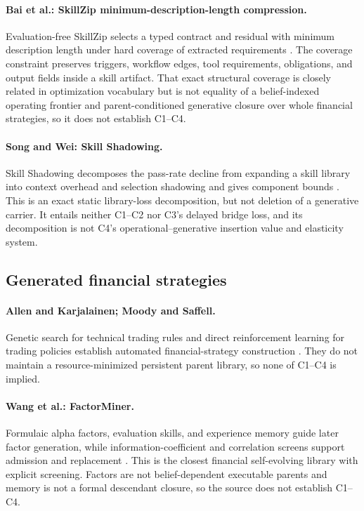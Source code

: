 \paragraph{Bai et al.: SkillZip minimum-description-length compression.}
Evaluation-free SkillZip selects a typed contract and residual with minimum
description length under hard coverage of extracted requirements
\cite{BaiEtAl2026SkillZipMDL}.  The coverage constraint preserves triggers,
workflow edges, tool requirements, obligations, and output fields inside a
skill artifact.  That exact structural coverage is closely related in
optimization vocabulary but is not equality of a belief-indexed operating
frontier and parent-conditioned generative closure over whole financial
strategies, so it does not establish C1--C4.

\paragraph{Song and Wei: Skill Shadowing.}
Skill Shadowing decomposes the pass-rate decline from expanding a skill
library into context overhead and selection shadowing and gives component
bounds \cite{SongWei2026SkillShadowing}.  This is an exact static library-loss
decomposition, but not deletion of a generative carrier.  It entails neither
C1--C2 nor C3's delayed bridge loss, and its decomposition is not C4's
operational--generative insertion value and elasticity system.

\subsection{Generated financial strategies}

\paragraph{Allen and Karjalainen; Moody and Saffell.}
Genetic search for technical trading rules and direct reinforcement learning
for trading policies establish automated financial-strategy construction
\cite{AllenKarjalainen1999,MoodySaffell2001}.  They do not maintain a
resource-minimized persistent parent library, so none of C1--C4 is implied.

\paragraph{Wang et al.: FactorMiner.}
Formulaic alpha factors, evaluation skills, and experience memory guide later
factor generation, while information-coefficient and correlation screens
support admission and replacement \cite{WangEtAl2026FactorMiner}.  This is
the closest financial self-evolving library with explicit screening.  Factors
are not belief-dependent executable parents and memory is not a formal
descendant closure, so the source does not establish C1--C4.

